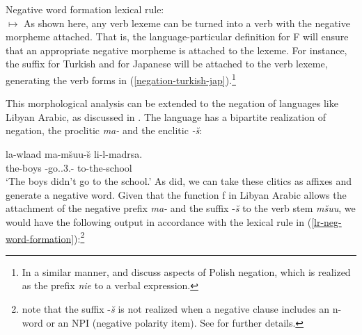 \documentclass[output=paper
	        ,collection
	        ,collectionchapter
 	        ,biblatex
                ,babelshorthands
                ,newtxmath
                ,draftmode
                ,colorlinks, citecolor=brown
]{langscibook}
\begin{document}
{\begin{exe}
\begin{xlist}
\begin{exe}
\begin{xlist}
\ea
\label{lr-neg-word-formation}
Negative word formation lexical rule:\\
 $\mapsto$
\z
%
%
As shown here, any verb lexeme can be turned into a verb with the negative
morpheme attached. That is, the language-particular definition for
F will ensure that an appropriate
negative morpheme is attached to the lexeme. For instance, the
suffix  for Turkish
and  for Japanese will be attached to the
 verb lexeme, generating
the verb forms in (\ref{negation-turkish-jap}).\footnote{In a similar
manner, \citet{PK:99} and \citet{Prz:00, Prz:01}
discuss aspects of Polish negation, which is realized as the prefix
  \emph{nie} to a verbal expression.}
%

This morphological analysis can be extended to the negation of languages
like Libyan Arabic, as discussed in \citet{BK:12}. The language
has a bipartite realization of negation, the proclitic \emph{ma-} and the enclitic \emph{-\u{s}}:

\ea
\gll la-wlaad ma-m\u{s}uu-\u{s} li-l-madrsa. \\
     the-boys \NEG-go.\pst.3.\pl-\NEG{} to-the-school\\
\glt `The boys didn't go to the school.'
\z
%
As \citet{BK:12} did, we can take these clitics as affixes and generate
a negative word. Given that the function
f in Libyan Arabic allows the attachment of the negative prefix
\textit{ma-} and the suffix -\textit{\u{s}} to the verb
stem \emph{m\u{s}uu}, we would have the following output in accordance
with the lexical rule in (\ref{lr-neg-word-formation}):\footnote{%
   \citet{BK:12} note that the suffix -\textit{\u{s}} is not realized when a negative clause
   includes an n-word or an NPI (negative polarity item). See \citet{BK:12} for further details.}
%
%



\end{xlist}
\end{exe}
\end{xlist}
\end{exe}}
\end{document}
